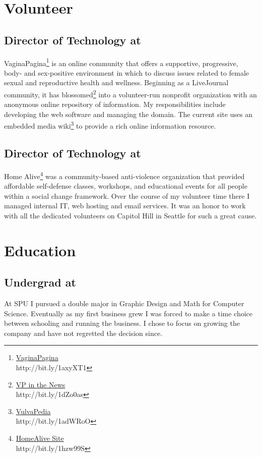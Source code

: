 \section{Volunteer }\label{sec:work-history}
\subsection{\textbf{Director of Technology} at  \shyears{[2001-PRESENT]}}
VaginaPagina\footnote{\href{http://vaginapagina.com}{VaginaPagina}\\ http://bit.ly/1axyXT1} is an online community that offers a supportive, progressive, body- and sex-positive environment in which to discuss issues related to female sexual and reproductive health and wellness.  Beginning as a LiveJournal community, it has blossomed\footnote{\href{http://www.dailydot.com/news/vagina-pagina-livejournal-tasha-walston/}{VP in the News}\\ http://bit.ly/1dZo0as} into a volunteer-run nonprofit organization with an anonymous online repository of information.  My responsibilities include developing the web software and managing the domain.  The current site uses an embedded media wiki\footnote{\href{http://wiki.vaginapagina.com/index.php?title=Main_Page}{VulvaPedia}\\ http://bit.ly/1adWRoO} to provide a rich online information resource.

\subsection{\textbf{Director of Technology} at  \shyears{[2000-2005]}}
Home Alive\footnote{\href{http://web.archive.org/web/20040721083500/http://www.homealive.org/}{HomeAlive Site}\\ http://bit.ly/1hzw99S} was a community-based anti-violence organization that provided affordable self-defense classes, workshops, and educational events for all people within a social change framework.  Over the course of my volunteer time there I managed internal IT, web hosting and email services.  It was an honor to work with all the dedicated volunteers on Capitol Hill in Seattle for such a great cause.

\bigskip
\bigskip

\section{Education }
\subsection{\textbf{Undergrad} at  \shyears[1995-1998]}
At SPU I pursued a double major in Graphic Design and Math for Computer Science.  Eventually as my first business grew I was forced to make a time choice between schooling and running the business.  I chose to focus on growing the company and have not regretted the decision since.
